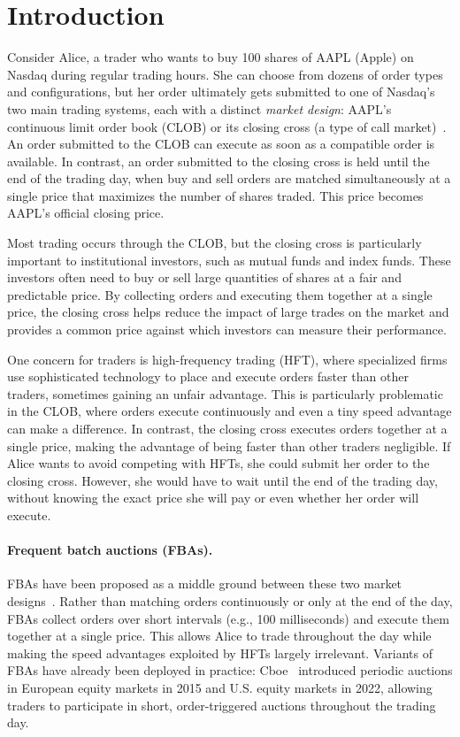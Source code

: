 
\section{Introduction}

Consider Alice, a trader who wants to buy 100 shares of AAPL (Apple) on Nasdaq during regular trading hours. She can choose from dozens of order types and configurations, but her order ultimately gets submitted to one of Nasdaq's two main trading systems, each with a distinct \textit{market design}: AAPL's continuous limit order book (CLOB) or its closing cross (a type of call market)~\cite{Har03}. An order submitted to the CLOB can execute as soon as a compatible order is available. In contrast, an order submitted to the closing cross is held until the end of the trading day, when buy and sell orders are matched simultaneously at a single price that maximizes the number of shares traded. This price becomes AAPL's official closing price. 

Most trading occurs through the CLOB, but the closing cross is particularly important to institutional investors, such as mutual funds and index funds. These investors often need to buy or sell large quantities of shares at a fair and predictable price. By collecting orders and executing them together at a single price, the closing cross helps reduce the impact of large trades on the market and provides a common price against which investors can measure their performance.

One concern for traders is high-frequency trading (HFT), where specialized firms use sophisticated technology to place and execute orders faster than other traders, sometimes gaining an unfair advantage. This is particularly problematic in the CLOB, where orders execute continuously and even a tiny speed advantage can make a difference. In contrast, the closing cross executes orders together at a single price, making the advantage of being faster than other traders negligible. If Alice wants to avoid competing with HFTs, she could submit her order to the closing cross. However, she would have to wait until the end of the trading day, without knowing the exact price she will pay or even whether her order will execute. 

\paragraph{Frequent batch auctions (FBAs).} FBAs have been proposed as a middle ground between these two market designs~\cite{BCS15}. Rather than matching orders continuously or only at the end of the day, FBAs collect orders over short intervals (e.g., 100 milliseconds) and execute them together at a single price. This allows Alice to trade throughout the day while making the speed advantages exploited by HFTs largely irrelevant. Variants of FBAs have already been deployed in practice: Cboe~\cite{+cboefba} introduced periodic auctions in European equity markets in 2015 and U.S. equity markets in 2022, allowing traders to participate in short, order-triggered auctions throughout the trading day.

